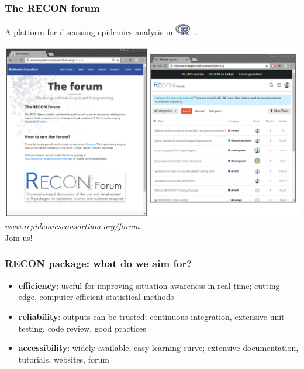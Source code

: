 \documentclass[xcolor=svgnames,mathserif]{beamer}
\newcommand{\Rlogo}{\includegraphics[width=0.05\textwidth]{figs/Rlogo-transp}~}
\begin{document}
\begin{frame}[fragile]
  \frametitle{The RECON forum}

\begin{center}
A platform for discussing epidemics analysis in \Rlogo.

  \includegraphics[width=.9\textwidth]{figs/forum}\\
\vspace{-.35cm}
{\tiny \emph{\url{www.repidemicsconsortium.org/forum}}}
\pause
~\\
\huge{\alert{Join us!}}

\end{center}


\end{frame}






\begin{frame}[fragile]
  \frametitle{RECON package: what do we aim for?}

 \begin{itemize} 
 \item \textbf{efficiency}: useful for improving situation awareness in real time; \alert{cutting-edge, computer-efficient statistical methods}
  \pause
 \vspace{.2cm}
 \item \textbf{reliability}: outputs can be trusted; \alert{continuous integration, extensive unit testing, code review, good practices}
  \pause
 \vspace{.2cm}
 \item \textbf{accessibility}: widely available, easy learning curve; \alert{extensive documentation, tutorials, websites, forum}
 \end{itemize}


\end{frame}
\end{document}
